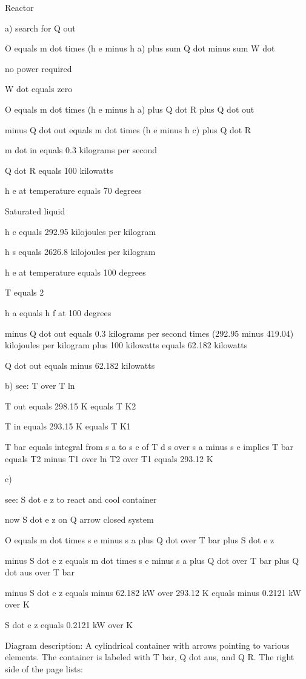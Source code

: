 Reactor

a) search for Q out

O equals m dot times (h e minus h a) plus sum Q dot minus sum W dot

no power required

W dot equals zero

O equals m dot times (h e minus h a) plus Q dot R plus Q dot out

minus Q dot out equals m dot times (h e minus h c) plus Q dot R

m dot in equals 0.3 kilograms per second

Q dot R equals 100 kilowatts

h e at temperature equals 70 degrees

Saturated liquid

h c equals 292.95 kilojoules per kilogram

h s equals 2626.8 kilojoules per kilogram

h e at temperature equals 100 degrees

T equals 2

h a equals h f at 100 degrees

minus Q dot out equals 0.3 kilograms per second times (292.95 minus 419.04) kilojoules per kilogram plus 100 kilowatts equals 62.182 kilowatts

Q dot out equals minus 62.182 kilowatts

b) see: T over T ln

T out equals 298.15 K equals T K2

T in equals 293.15 K equals T K1

T bar equals integral from s a to s e of T d s over s a minus s e implies T bar equals T2 minus T1 over ln T2 over T1 equals 293.12 K

c)

see: S dot e z to react and cool container

now S dot e z on Q arrow closed system

O equals m dot times s e minus s a plus Q dot over T bar plus S dot e z

minus S dot e z equals m dot times s e minus s a plus Q dot over T bar plus Q dot aus over T bar

minus S dot e z equals minus 62.182 kW over 293.12 K equals minus 0.2121 kW over K

S dot e z equals 0.2121 kW over K

Diagram description:
A cylindrical container with arrows pointing to various elements. The container is labeled with T bar, Q dot aus, and Q R. The right side of the page lists:

